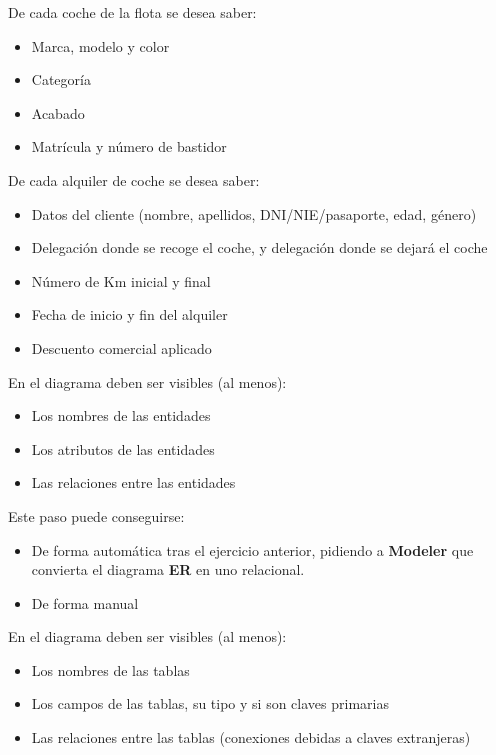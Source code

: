 De cada coche de la flota se desea saber:
\begin{itemize}
\item Marca, modelo y color
\item Categoría
\item Acabado
\item Matrícula y número de bastidor
\end{itemize}

De cada alquiler de coche se desea saber:
\begin{itemize}
\item Datos del cliente (nombre, apellidos, DNI/NIE/pasaporte, edad,
  género)
\item  Delegación donde se recoge el coche, y delegación donde se
  dejará el coche
\item  Número de Km inicial y final
\item  Fecha de inicio y fin del alquiler
\item  Descuento comercial aplicado
\end{itemize}


\begin{homeworkProblem}
  En el diagrama deben ser visibles (al menos):
  \begin{itemize}
  \item Los nombres de las entidades
  \item Los atributos de las entidades
  \item Las relaciones entre las entidades
  \end{itemize}

\end{homeworkProblem}

\begin{homeworkProblem}
  Este paso puede conseguirse:
  \begin{itemize}
  \item De forma automática tras el ejercicio anterior, pidiendo a \textbf{Modeler} que convierta el diagrama \textbf{ER} en uno relacional.
  \item De forma manual
  \end{itemize}

  En el diagrama deben ser visibles (al menos):
  \begin{itemize}
  \item Los nombres de las tablas
  \item Los campos de las tablas, su tipo y si son claves primarias
  \item Las relaciones entre las tablas (conexiones debidas a claves extranjeras)  
  \end{itemize}
  
\end{homeworkProblem}


